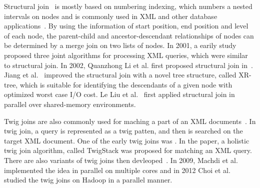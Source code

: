 Structural join~\cite{AlJYK02} is mostly based on numbering
indexing\cite{numbering}, which numbers a nested intervals on nodes and is
commonly used in XML and other database
applications~\cite{ZNDI01,HAJR03,ZNDI01}. By using the information of start
position, end position and level of each node, the parent-child and
ancestor-descendant relationships of nodes can be determined by a merge join on
two lists of nodes. In 2001, a earily study~\cite{LiMo01} proposed three joint
algorithms for processing XML queries, which were similar to structural join. In
2002, Quanzhong Li et al. first proposed structural join in~\cite{AlJYK02}.
Jiang et al.~\cite{JLWO03} improved the structural join with a novel tree
structure, called XR-tree, which is suitable for identifying the descendants of
a given node with optimized worst case I/O cost. Le Liu et al.~\cite{LFLQ08}
first applied structural join in parallel over shared-memory environments.

Twig joins are also commonly used for maching a part of an XML
documents~\cite{jiang2003holistic,lu2005efficient,lu2005tjfast,
fontoura2005optimizing}. In twig join, a query is represented as a twig patten,
and then is searched on the target XML document. One of the early twig joins was
\cite{BrKS02}. In the paper, a holistic twig join algorithm, called TwigStack
was proposed for matching an XML query. There are also variants of twig joins
then devleoped~\cite{CLTH06,QiYD07}. In 2009, Machdi et al.~\cite{MaAK09}
implemented the idea in parallel on multiple cores and in 2012 Choi et
al.~\cite{CLKL12} studied the twig joins on Hadoop in a parallel manner.




